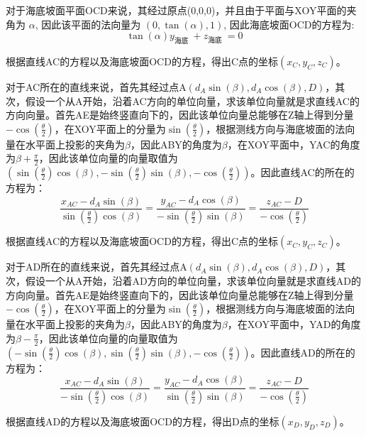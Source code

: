 \documentclass[12pt,a4paper]{article}
\begin{document}
对于海底坡面平面OCD来说，其经过原点(0,0,0)，并且由于平面与XOY平面的夹角为 $\alpha$, 因此该平面的法向量为 $(0, \tan (\alpha), 1)$, 因此海底坡面OCD的方程为:
$$
\tan (\alpha) y_{\text {海底 }}+z_{\text {海底 }}=0
$$

根据直线AC的方程以及海底坡面OCD的方程，得出C点的坐标$\left( {{x}_{C}},{{y}_{C}},{{z}_{C}} \right)$。

对于AC所在的直线来说，首先其经过点A$\left( {{d}_{A}}\sin \left( \beta  \right),{{d}_{A}}\cos \left( \beta  \right),D \right)$，其次，假设一个从A开始，沿着AC方向的单位向量，求该单位向量就是求直线AC的方向向量。首先AE是始终竖直向下的，因此该单位向量总能够在Z轴上得到分量$-\cos \left( \frac{\theta }{2} \right)$，在XOY平面上的分量为$\sin \left( \frac{\theta }{2} \right)$，根据测线方向与海底坡面的法向量在水平面上投影的夹角为$\beta $，因此ABY的角度为$\beta $，在XOY平面中，YAC的角度为$\beta +\frac{\pi }{2}$，因此该单位向量的向量取值为$\left( \sin \left( \frac{\theta }{2} \right)\cos \left( \beta  \right),-\sin \left( \frac{\theta }{2} \right)\sin \left( \beta  \right),-\cos \left( \frac{\theta }{2} \right) \right)$。因此直线AC的所在的方程为：
$$
\frac{x_{A C}-d_A \sin (\beta)}{\sin \left(\frac{\theta}{2}\right) \cos (\beta)}=\frac{y_{A C}-d_A \cos (\beta)}{-\sin \left(\frac{\theta}{2}\right) \sin (\beta)}=\frac{z_{A C}-D}{-\cos \left(\frac{\theta}{2}\right)}
$$

根据直线AC的方程以及海底坡面OCD的方程，得出C点的坐标$\left( {{x}_{C}},{{y}_{C}},{{z}_{C}} \right)$。

对于AD所在的直线来说，首先其经过点A$\left( {{d}_{A}}\sin \left( \beta  \right),{{d}_{A}}\cos \left( \beta  \right),D \right)$，其次，假设一个从A开始，沿着AD方向的单位向量，求该单位向量就是求直线AD的方向向量。首先AE是始终竖直向下的，因此该单位向量总能够在Z轴上得到分量$-\cos \left( \frac{\theta }{2} \right)$，在XOY平面上的分量为$\sin \left( \frac{\theta }{2} \right)$，根据测线方向与海底坡面的法向量在水平面上投影的夹角为$\beta $，因此ABY的角度为$\beta $，在XOY平面中，YAD的角度为$\beta -\frac{\pi }{2}$，因此该单位向量的向量取值为$\left( -\sin \left( \frac{\theta }{2} \right)\cos \left( \beta  \right),\sin \left( \frac{\theta }{2} \right)\sin \left( \beta  \right),-\cos \left( \frac{\theta }{2} \right) \right)$。因此直线AD的所在的方程为：
$$
\frac{x_{A C}-d_A \sin (\beta)}{-\sin \left(\frac{\theta}{2}\right) \cos (\beta)}=\frac{y_{A C}-d_A \cos (\beta)}{\sin \left(\frac{\theta}{2}\right) \sin (\beta)}=\frac{z_{A C}-D}{-\cos \left(\frac{\theta}{2}\right)}
$$

根据直线AD的方程以及海底坡面OCD的方程，得出D点的坐标$\left( {{x}_{D}},{{y}_{D}},{{z}_{D}} \right)$。
\end{document}
